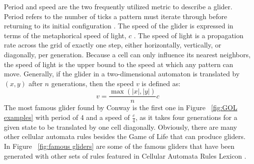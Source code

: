 \documentclass[12pt]{article}
\numberwithin{figure}{section} %
\begin{document}
Period and speed are the two frequently utilized metric to describe a glider. Period refers to the number of ticks a pattern must iterate through before returning to its initial configuration \cite{The Game of Life}. The speed of the glider is expressed in terms of the metaphorical speed of light, $c$ \cite{spaceship, speed of light}. The speed of light is a propagation rate across the grid of exactly one step, either horizontally, vertically, or diagonally, per generation. Because a cell can only influence its nearest neighbors, the speed of light is the upper bound to the speed at which any pattern can move. Generally, if the glider in a two-dimensional automaton is translated by $(x,y)$ after $n$ generations, then the speed $v$ is defined as: 
$$v = \frac{\max(|x|, |y|)}{n}c$$
The most famous glider found by Conway is the first one in Figure ~\ref{fig:GOL examples} with period of 4 and a speed of $\frac{c}{4}$, as it takes four generations for a given state to be translated by one cell diagonally. Obviously, there are many other cellular automata rules besides the Game of Life that can produce gliders. In Figure ~\ref{fig:famous gliders} are some of the famous gliders that have been generated with other sets of rules featured in Cellular Automata Rules Lexicon \cite{Lexicon}. 
\end{document}
